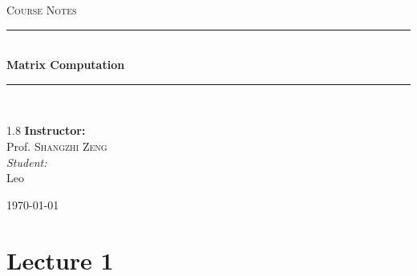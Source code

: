 \documentclass[11pt, a4paper]{report}
\newcommand{\HRule}[1]{\rule{\linewidth}{#1}}
\begin{document}
\begin{titlepage}
    \centering
    \vspace*{2cm}
    
    \textsc{\Large Course Notes}\\[0.5cm]

    \HRule{1.5pt} \\[0.5cm]
    { \huge \bfseries Matrix Computation }\\[0.4cm] 
    \HRule{1.5pt} \\[1.5cm]
    
    \vspace{3cm}

    \begin{spacing}{1.8}
        {\Large \textbf{Instructor:}} \\
        {\Large Prof. \textsc{Shangzhi Zeng}} \\[0.8cm]
        
        {\normalsize \textit{Student:}} \\
        {\normalsize Leo}
    \end{spacing}

    \vfill
    {\large \today}
\end{titlepage}
\newpage
\tableofcontents
\newpage


\chapter{Lecture 1}
\end{document}
